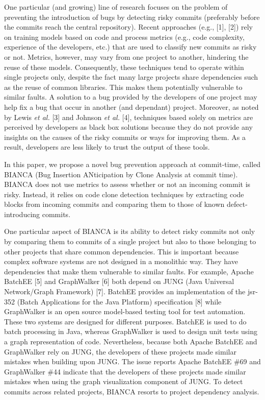 \documentclass[conference]{IEEEtran}
\begin{document}
One particular (and growing) line of research focuses on the problem of
preventing the introduction of bugs by detecting risky commits
(preferably before the commits reach the central repository). Recent
approaches (e.g., {[}1{]}, {[}2{]}) rely on training models based on
code and process metrics (e.g., code complexity, experience of the
developers, etc.) that are used to classify new commits as risky or not.
Metrics, however, may vary from one project to another, hindering the
reuse of these models. Consequently, these techniques tend to operate
within single projects only, despite the fact many large projects share
dependencies such as the reuse of common libraries. This makes them
potentially vulnerable to similar faults. A solution to a bug provided
by the developers of one project may help fix a bug that occur in
another (and dependant) project. Moreover, as noted by Lewis \emph{et
al.} {[}3{]} and Johnson \emph{et al.} {[}4{]}, techniques based solely
on metrics are perceived by developers as black box solutions because
they do not provide any insights on the causes of the risky commits or
ways for improving them. As a result, developers are less likely to
trust the output of these tools.

In this paper, we propose a novel bug prevention approach at
commit-time, called BIANCA (Bug Insertion ANticipation by Clone Analysis
at commit time). BIANCA does not use metrics to assess whether or not an
incoming commit is risky. Instead, it relies on code clone detection
techniques by extracting code blocks from incoming commits and comparing
them to those of known defect-introducing commits.

One particular aspect of BIANCA is its ability to detect risky commits
not only by comparing them to commits of a single project but also to
those belonging to other projects that share common dependencies. This
is important because complex software systems are not designed in a
monolithic way. They have dependencies that make them vulnerable to
similar faults. For example, Apache BatchEE {[}5{]} and GraphWalker
{[}6{]} both depend on JUNG (Java Universal Network/Graph Framework)
{[}7{]}. BatchEE provides an implementation of the jsr-352 (Batch
Applications for the Java Platform) specification {[}8{]} while
GraphWalker is an open source model-based testing tool for test
automation. These two systems are designed for different purposes.
BatchEE is used to do batch processing in Java, whereas GraphWalker is
used to design unit tests using a graph representation of code.
Nevertheless, because both Apache BatchEE and GraphWalker rely on JUNG,
the developers of these projects made similar mistakes when building
upon JUNG. The issue reports Apache BatchEE \#69 and GraphWalker \#44
indicate that the developers of these projects made similar mistakes
when using the graph visualization component of JUNG. To detect commits
across related projects, BIANCA resorts to project dependency analysis.
\end{document}
